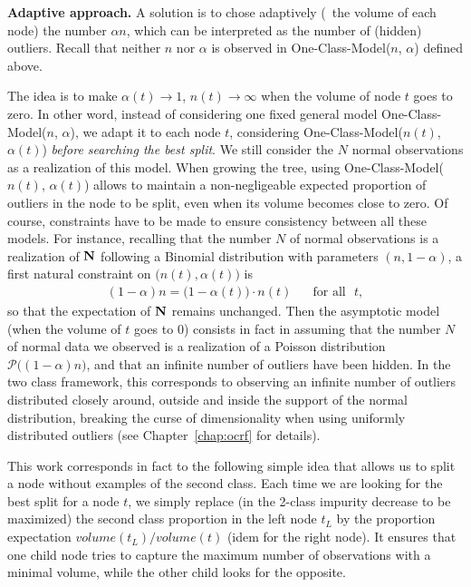 \textbf{Adaptive approach.}
%
A solution is to chose adaptively (\wrt~the volume of each node) the number $\alpha n$, which can be interpreted as the number of (hidden) outliers. Recall that neither $n$ nor $\alpha$ is observed in One-Class-Model($n$, $\alpha$) defined above. 

The idea is to make $\alpha(t) \to 1$, $n(t) \to \infty$ when the volume of node $t$ goes to zero.
%
In other word, instead of considering one fixed general model One-Class-Model($n$, $\alpha$), we adapt it to each node $t$, considering One-Class-Model($n(t)$, $\alpha(t)$) \emph{before searching the best split}. We still consider the $N$ normal observations as a realization of this model. When growing the tree, using One-Class-Model($n(t)$, $\alpha(t)$) allows to maintain a non-negligeable expected proportion of outliers in the node to be split, even when its volume becomes close to zero.
Of course, constraints have to be made to ensure consistency between all these models.
%
For instance, recalling that the number $N$ of normal observations is a realization of $\mathbf N$ following a Binomial distribution with parameters $(n, 1-\alpha)$, a first natural constraint on $\big(n(t), \alpha(t)\big)$ is
\begin{align}
\label{constraint1}
(1-\alpha)n = \big(1-\alpha(t)\big) \cdot n(t) \text{~~~~~for all~~} t,
\end{align}
so that the expectation of $\mathbf N$ remains unchanged. 
Then the asymptotic model (when the volume of $t$ goes to $0$) consists in fact in assuming that the number $N$ of normal data we observed is a realization of a Poisson distribution $\mathcal{P}\big((1-\alpha)n\big)$, and that an infinite number of outliers have been hidden. In the two class framework, this corresponds to observing an infinite number of outliers distributed closely around, outside and inside the support of the normal distribution, breaking the curse of dimensionality when using uniformly distributed outliers (see Chapter~\ref{chap:ocrf} for details).

\begin{remark}
This work corresponds in fact to the following simple idea that allows us to split a node without examples of the second class.
Each time we are looking for the best split for a node $t$, we simply replace (in the 2-class impurity decrease to be maximized) the second class proportion in the left node $t_L$ by the proportion expectation $volume(t_L)/volume(t)$ (idem for the right node).
It ensures that one child node tries to capture the maximum number of observations with a minimal volume, while the other child looks for the opposite. %
\end{remark}


